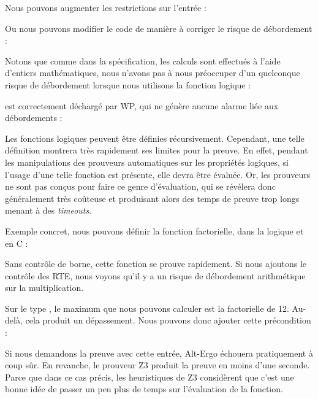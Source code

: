 Nous pouvons augmenter les restrictions sur l'entrée :




Ou nous pouvons modifier le code de manière à corriger le risque
de débordement :




Notons que comme dans la spécification, les calculs sont effectués à l'aide
d'entiers mathématiques, nous n'avons pas à nous préoccuper d'un quelconque
risque de débordement lorsque nous utilisons la fonction logique  :




est correctement déchargé par WP, qui ne génère aucune alarme liée aux
débordements :






Les fonctions logiques peuvent être définies récursivement. Cependant, une telle
définition montrera très rapidement ses limites pour la preuve. En effet,
pendant les manipulations des prouveurs automatiques sur les propriétés
logiques, si l'usage d'une telle fonction est présente, elle devra être évaluée.
Or, les prouveurs ne sont pas conçus pour faire ce genre d'évaluation, qui se
révélera donc généralement très coûteuse et produisant alors des temps de preuve
trop longs menant à des \textit{timeouts}.



Exemple concret, nous pouvons définir la fonction factorielle, dans la logique
et en C :






Sans contrôle de borne, cette fonction se prouve rapidement. Si nous ajoutons
le contrôle des RTE, nous voyons qu'il y a un risque de débordement
arithmétique sur la multiplication.



Sur le type , le maximum que nous pouvons calculer est la factorielle de
12. Au-delà, cela produit un dépassement. Nous pouvons donc ajouter cette
précondition :






Si nous demandons la preuve avec cette entrée, Alt-Ergo échouera pratiquement à
coup sûr. En revanche, le prouveur Z3 produit la preuve en moins d'une seconde.
Parce que dans ce cas précis, les heuristiques de Z3 considèrent que c'est une
bonne idée de passer un peu plus de temps sur l'évaluation de la fonction.




